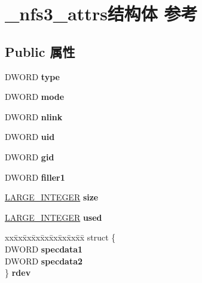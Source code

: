 \hypertarget{struct__nfs3__attrs}{}\section{\+\_\+nfs3\+\_\+attrs结构体 参考}
\label{struct__nfs3__attrs}
\subsection*{Public 属性}
\begin{DoxyCompactItemize}
\item 
\mbox{\label{struct__nfs3__attrs_afd674c4efcb7ba9f0c4805c0a20cd5d7}} 
D\+W\+O\+RD {\bfseries type}
\item 
\mbox{\label{struct__nfs3__attrs_a0bcd73598edbcca231487e86fb5b8ece}} 
D\+W\+O\+RD {\bfseries mode}
\item 
\mbox{\label{struct__nfs3__attrs_ad8ac87ffac7e6a22bdf5956574e90a6c}} 
D\+W\+O\+RD {\bfseries nlink}
\item 
\mbox{\label{struct__nfs3__attrs_a90b2815bb22590835d134ed6fddc2247}} 
D\+W\+O\+RD {\bfseries uid}
\item 
\mbox{\label{struct__nfs3__attrs_a67afd5ca070dbc5356e0bc80af9cae1a}} 
D\+W\+O\+RD {\bfseries gid}
\item 
\mbox{\label{struct__nfs3__attrs_a36d991f060c95051daf2ecad67cc3af5}} 
D\+W\+O\+RD {\bfseries filler1}
\item 
\mbox{\label{struct__nfs3__attrs_a2d020a1b544a11c78d5e1fac8c897855}} 
\hyperlink{union___l_a_r_g_e___i_n_t_e_g_e_r}{L\+A\+R\+G\+E\+\_\+\+I\+N\+T\+E\+G\+ER} {\bfseries size}
\item 
\mbox{\label{struct__nfs3__attrs_a38d62f4c5e0c68ae9d24782fa538c594}} 
\hyperlink{union___l_a_r_g_e___i_n_t_e_g_e_r}{L\+A\+R\+G\+E\+\_\+\+I\+N\+T\+E\+G\+ER} {\bfseries used}
\item 
\mbox{\label{struct__nfs3__attrs_abaf82d2bd939736c4d7979d83bf5acb2}} 
\begin{tabbing}
xx\=xx\=xx\=xx\=xx\=xx\=xx\=xx\=xx\=\kill
struct \{\\
\>DWORD {\bfseries specdata1}\\
\>DWORD {\bfseries specdata2}\\
\} {\bfseries rdev}\\


\end{tabbing}
\end{DoxyCompactItemize}
